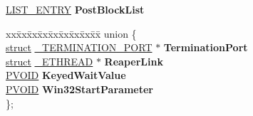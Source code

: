 \begin{DoxyCompactItemize}
\begin{tabbing}
\end{tabbing}\item 
\mbox{\label{struct___e_t_h_r_e_a_d_afee092c552102e61d82b1c2f7ed4a48c}} 
\hyperlink{struct___l_i_s_t___e_n_t_r_y}{L\+I\+S\+T\+\_\+\+E\+N\+T\+RY} {\bfseries Post\+Block\+List}
\item 
\mbox{\label{struct___e_t_h_r_e_a_d_aa099e61eb5e9b99fe56fe4dce086baff}} 
\begin{tabbing}
xx\=xx\=xx\=xx\=xx\=xx\=xx\=xx\=xx\=\kill
union \{\\
\>\hyperlink{interfacestruct}{struct} \hyperlink{struct___t_e_r_m_i_n_a_t_i_o_n___p_o_r_t}{\_TERMINATION\_PORT} $\ast$ {\bfseries TerminationPort}\\
\>\hyperlink{interfacestruct}{struct} \hyperlink{struct___e_t_h_r_e_a_d}{\_ETHREAD} $\ast$ {\bfseries ReaperLink}\\
\>\hyperlink{interfacevoid}{PVOID} {\bfseries KeyedWaitValue}\\
\>\hyperlink{interfacevoid}{PVOID} {\bfseries Win32StartParameter}\\
\}; \\


\end{tabbing}
\end{DoxyCompactItemize}
